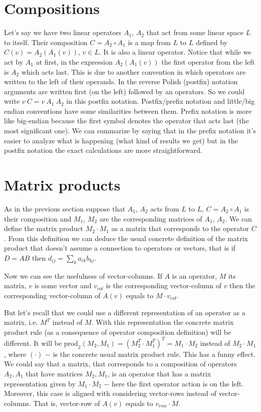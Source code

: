 \documentclass{article}
\begin{document}
\section{Compositions}
Let's say we have two linear operators $A_1$, $A_2$ that act from some linear space $L$ to itself. 
Their composition $C = A_2 \circ A_1$ is a map from $L$ to $L$ defined by $C(v) = A_2(A_1(v))$, $v \in L$. 
It is also a linear operator. 
Notice that while we act by $A_1$ at first, 
in the expression $A_2(A_1(v))$ the first operator from the left is $A_2$ which acts last. 
This is due to another convention in which operators are written to the left of their operands. 
In the reverse Polish (postfix) notation arguments are written first (on the left) followed by an operators.
So we could write $v~C = v ~ A_1 ~ A_2$ in this postfix notation. 
Postfix/prefix notation and little/big endian conventions have some similarities between them.  
Prefix notation is more like big-endian because the first symbol denotes the operator that acts last (the most significant one).
We can summarize by saying that in the prefix notation it's easier to analyze what is happening (what kind of results we get)
but in the postfix notation the exact calculations are more straightforward.

\section{Matrix products}
As in the previous section suppose that $A_1$, $A_2$ acts from $L$ to $L$, $C = A_2 \circ A_1$ is their composition 
and $M_1$, $M_2$ are the corresponding matrices of $A_1$, $A_2$. 
We can define the matrix product $M_2 \cdot M_1$ as a matrix that corresponds to the operator $C$. 
From this definition we can deduce the usual concrete definition of the matrix product that doesn't assume a connection to operators or vectors, 
that is if $D = AB$ then $d_{ij} = \sum_k a_{ik}b_{kj}$. 

Now we can see the usefulness of vector-columns. 
If $A$ is an operator, $M$ its matrix, $v$ is some vector and $v_{col}$ is the corresponding vector-column of $v$ then 
the corresponding vector-column of $A(v)$ equals to $M \cdot v_{col}$. 

But let's recall that we could use a different representation of an operator as a matrix, i.e. $M^T$ instead of $M$. 
With this representation the concrete matrix product rule (as a consequence of operator composition definition) will be different. 
It will be $\textrm{prod}_2(M_2,M_1) = (M_2^T \cdot M_1^T)^T = M_1 \cdot M_2$ instead of $M_2 \cdot M_1$, 
where $(\cdot)$ $-$ is the concrete usual matrix product rule. 
This has a funny effect. 
We could say that a matrix, 
that corresponds to a composition of operators $A_2,A_1$ that have matrices $M_2,M_1$,
is an operator that has a matrix representation given by $M_1 \cdot M_2$ $-$ here the first operator action is on the left. 
Moreover, this case is aligned with considering vector-rows instead of vector-columns. 
That is, vector-row of $A(v)$ equals to $v_{row} \cdot M$.
\end{document}
